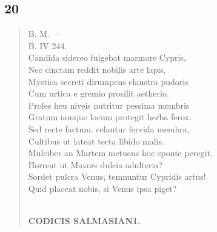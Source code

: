 \documentclass[11pt, a4paper]{report}
\begin{document}
            \subsection*{20}
      \begin{verse}
      B. M. — \\ B. IV 244. \\ Candida sidereo fulgebat marmore Cypris, \\ Nec cinctam reddit nobilis arte lapis, \\ Mystica secreti dirumpens claustra pudoris \\ Cum urtica  \lbrack e \rbrack  gremio prosilit aetherio. \\ Proles heu niveis nutritur pessima membris \\ Gratum iamque locum protegit herba ferox. \\ Sed recte factum. celantur fervida membra, \\ Cultibus ut lateat tecta libido malis. \\ Mulciber an Martem metuens hoc sponte peregit, \\ Horreat ut Mavors dulcia adulteria? \\ Sordet pulcra Venus, temnuntur Cypridis artus! \\ Quid placeat nobis, si Venus ipsa piget? \\ 
        ﻿\pagebreak 
    \begin{center} \textbf{CODICIS SALMASIAN1.} \end{center} \marginpar{[85]} 
      \end{verse}
  
\end{document}
